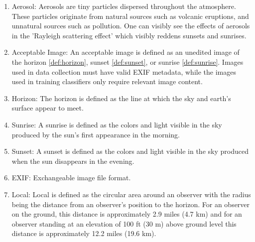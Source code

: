 \documentclass[journal,10pt,draftclsnofoot,onecolumn]{IEEEtran}
\begin{document}
\begin{singlespace}
\begin{enumerate}
	\item \label{def:aerosol} Aerosol: Aerosols are tiny particles dispersed throughout the atmosphere.
	These particles originate from natural sources such as volcanic eruptions, and unnatural sources such as pollution. 
	One can visibly see the effects of aerosols in the 'Rayleigh scattering effect' which visibly reddens sunsets and sunrises. \\

	\item \label{def:accImg} Acceptable Image: An acceptable image is defined as an unedited image of the horizon \ref{def:horizon}, sunset \ref{def:sunset}, or sunrise \ref{def:sunrise}.
	Images used in data collection must have valid EXIF metadata, while the images used in training classifiers only require relevant image content.\\

	\item \label{def:horizon} Horizon: The horizon is defined as the line at which the sky and earth's surface appear to meet.\\

	\item \label{def:sunrise} Sunrise: A sunrise is defined as the colors and light visible in the sky produced by the sun's first appearance in the morning.\\

	\item \label{def:sunset} Sunset: A sunset is defined as the colors and light visible in the sky produced when the sun disappears in the evening.\\

	\item \label{def:exif} EXIF: Exchangeable image file format. \\

	\item \label{def:local} Local: Local is defined as the circular area around an observer with the radius being the distance from an observer's position to the horizon. For an observer on the ground, this distance is approximately 2.9 miles (4.7 km) and for an observer standing at an elevation of 100 ft (30 m) above ground level this distance is approximately 12.2 miles (19.6 km). \\

\end{enumerate}

\clearpage
\nocite{*}




\end{singlespace}
\end{document}

